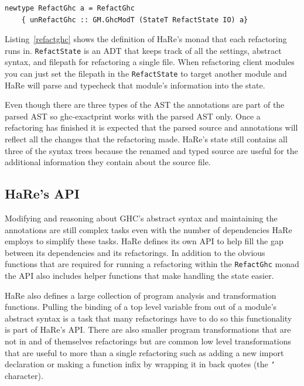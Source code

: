 \begin{lstlisting}[caption={HaRe's Monad \texttt{RefactGhc}},captionpos=b, label=refactghc] 
newtype RefactGhc a = RefactGhc
    { unRefactGhc :: GM.GhcModT (StateT RefactState IO) a}
\end{lstlisting}

Listing~\ref{refactghc} shows the definition of HaRe's monad that each refactoring runs in. \texttt{RefactState} is an ADT that keeps track of all the settings, abstract syntax, and filepath for refactoring a single file. When refactoring client modules you can just set the filepath in the \texttt{RefactState} to target another module and HaRe will parse and typecheck that module's information into the state.

Even though there are three types of the AST the annotations are part of the parsed AST so ghc-exactprint works with the parsed AST only. Once a refactoring has finished it is expected that the parsed source and annotations will reflect all the changes that the refactoring made. HaRe's state still contains all three of the syntax trees because the renamed and typed source are useful for the additional information they contain about the source file. 

\subsection{HaRe's API}

Modifying and reasoning about GHC's abstract syntax and maintaining the annotations are still complex tasks even with the number of dependencies HaRe employs to simplify these tasks. HaRe defines its own API to help fill the gap between its dependencies and its refactorings. In addition to the obvious functions that are required for running a refactoring within the \texttt{RefactGhc} monad the API also includes helper functions that make handling the state easier. 

HaRe also defines a large collection of program analysis and transformation functions. Pulling the binding of a top level variable from out of a module's abstract syntax is a task that many refactorings have to do so this functionality is part of HaRe's API. There are also smaller program transformations that are not in and of themselves refactorings but are common low level transformations that are useful to more than a single refactoring such as adding a new import declaration or making a function infix by wrapping it in back quotes (the \texttt{`} character).

